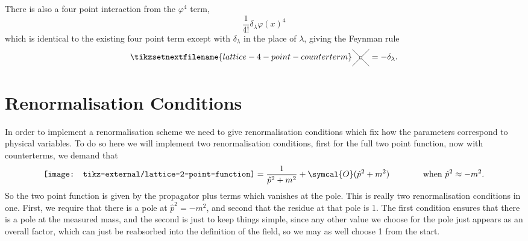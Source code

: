 \documentclass[fleqn]{NotesClass}
\newcommand{\order}{\symcal{O}}
\begin{document}
    There is also a four point interaction from the \(\varphi^4\) term,
    \begin{equation}
        \frac{1}{4!}\delta_\lambda \varphi(x)^4
    \end{equation}
    which is identical to the existing four point term except with \(\delta_\lambda\) in the place of \(\lambda\), giving the Feynman rule
    \begin{equation}
        \tikzsetnextfilename{lattice-4-point-counterterm}
        \begin{tikzpicture}[baseline=-2pt]
            \draw (45:0.5) -- (225:0.5);
            \draw (-45:0.5) -- (-225:0.5);
            \draw[fill=white] (-0.05, -0.05) rectangle (0.05, 0.05);
        \end{tikzpicture}
        = - \delta_\lambda.
    \end{equation}
    
    \section{Renormalisation Conditions}
    In order to implement a renormalisation scheme we need to give renormalisation conditions which fix how the parameters correspond to physical variables.
    To do so here we will implement two renormalisation conditions, first for the full two point function, now with counterterms, we demand that
    \begin{equation}
        \vcenter{\hbox{\texttt{[image: tikz-external/lattice-2-point-function]}}} = \frac{1}{\hat{p}^2 + m^2} + \order(\hat{p}^2 + m^2) \qquad\qquad \text{when \(\hat{p}^2 \approx -m^2\).}
    \end{equation}
    So the two point function is given by the propagator plus terms which vanishes at the pole.
    This is really two renormalisation conditions in one.
    First, we require that there is a pole at \(\hat{p}^2 = -m^2\), and second that the residue at that pole is 1.
    The first condition ensures that there is a pole at the measured mass, and the second is just to keep things simple, since any other value we choose for the pole just appears as an overall factor, which can just be reabsorbed into the definition of the field, so we may as well choose 1 from the start.
    
\end{document}
